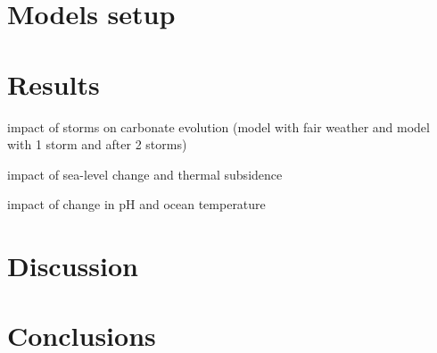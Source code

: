 \documentclass[default,jgrga]{agutex2015}
\begin{document}
\begin{article}
\section{Models setup}


\section{Results}

impact of storms on carbonate evolution (model with fair weather and model with 1 storm and after 2 storms)

impact of sea-level change and thermal subsidence

impact of change in pH and ocean temperature

\section{Discussion}


\section{Conclusions}


%
%
%
%
%
%
%


\end{article}
\end{document}
